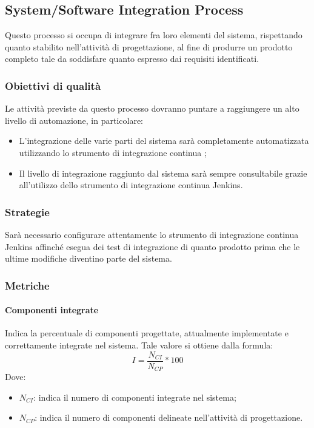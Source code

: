 \documentclass[../PianoDiQualifica.tex]{subfiles}
\begin{document}
		
		\subsection{System/Software Integration Process}
		Questo processo si occupa di integrare fra loro elementi del sistema, rispettando quanto stabilito nell'attività di progettazione, al fine di produrre un prodotto completo tale da soddisfare quanto espresso dai requisiti identificati.
			
			\subsubsection{Obiettivi di qualità}
			Le attività previste da questo processo dovranno puntare a raggiungere un alto livello di automazione, in particolare:
			\begin{itemize}
				\item L'integrazione delle varie parti del sistema sarà completamente automatizzata utilizzando lo strumento di integrazione continua ;
				\item Il livello di integrazione raggiunto dal sistema sarà sempre consultabile grazie all'utilizzo dello strumento di integrazione continua Jenkins.
			\end{itemize}
			
			\subsubsection{Strategie}
			Sarà necessario configurare attentamente lo strumento di integrazione continua Jenkins affinché esegua dei test di integrazione di quanto prodotto prima che le ultime modifiche diventino parte del sistema.
			
			\subsubsection{Metriche}
				\paragraph{Componenti integrate}
				Indica la percentuale di componenti progettate, attualmente implementate e correttamente integrate nel sistema.
				Tale valore si ottiene dalla formula:
				\begin{equation*}
					I = \frac{N_{CI}}{N_{CP}} * 100
				\end{equation*}
				Dove:
				\begin{itemize}
					\item \textbf{$N_{CI}$}: indica il numero di componenti integrate nel sistema;
					\item \textbf{$N_{CP}$}: indica il numero di componenti delineate nell'attività di progettazione.
				\end{itemize}
			
\end{document}

